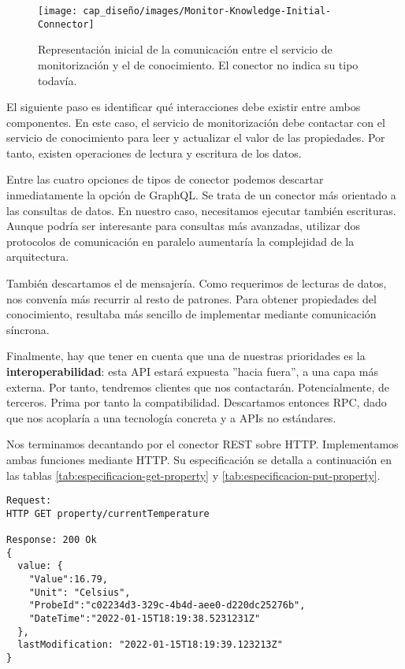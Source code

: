 \begin{figure}[htb]
  \centering
  \texttt{[image: cap\_diseño/images/Monitor-Knowledge-Initial-Connector]}
  \caption{Representación inicial de la comunicación entre el servicio de monitorización y el de conocimiento. El conector no indica su tipo todavía.}
  \label{fig:monitor-knowledge-initial}
\end{figure}

El siguiente paso es identificar qué interacciones debe existir entre ambos componentes. En este caso, el servicio de monitorización debe contactar con el servicio de conocimiento para leer y actualizar el valor de las propiedades. Por tanto, existen operaciones de lectura y escritura de los datos.

Entre las cuatro opciones de tipos de conector podemos descartar inmediatamente la opción de GraphQL. Se trata de un conector más orientado a las consultas de datos. En nuestro caso, necesitamos ejecutar también escrituras. Aunque podría ser interesante para consultas más avanzadas, utilizar dos protocolos de comunicación en paralelo aumentaría la complejidad de la arquitectura.

También descartamos el  de mensajería. Como requerimos de lecturas de datos, nos convenía más recurrir al resto de patrones. Para obtener propiedades del conocimiento, resultaba más sencillo de implementar mediante comunicación síncrona.

Finalmente, hay que tener en cuenta que una de nuestras prioridades es la \textbf{interoperabilidad}: esta API estará expuesta ''hacia fuera'', a una capa más externa. Por tanto, tendremos clientes que nos contactarán. Potencialmente, de terceros. Prima por tanto la compatibilidad. Descartamos entonces RPC, dado que nos acoplaría a una tecnología concreta y a APIs no estándares.

Nos terminamos decantando por el conector REST sobre HTTP. Implementamos ambas funciones mediante  HTTP. Su especificación se detalla a continuación en las tablas \ref{tab:especificacion-get-property} y \ref{tab:especificacion-put-property}.

\newsavebox\getpropertyrequestbox
\begin{lrbox}{\getpropertyrequestbox}
  \begin{minipage}[t]{1in}
    \begin{verbatim}
Request:
HTTP GET property/currentTemperature

Response: 200 Ok
{
  value: {
    "Value":16.79,
    "Unit": "Celsius",
    "ProbeId":"c02234d3-329c-4b4d-aee0-d220dc25276b",
    "DateTime":"2022-01-15T18:19:38.5231231Z"
  },
  lastModification: "2022-01-15T18:19:39.123213Z"
}
    \end{verbatim}
  \end{minipage}
\end{lrbox}

